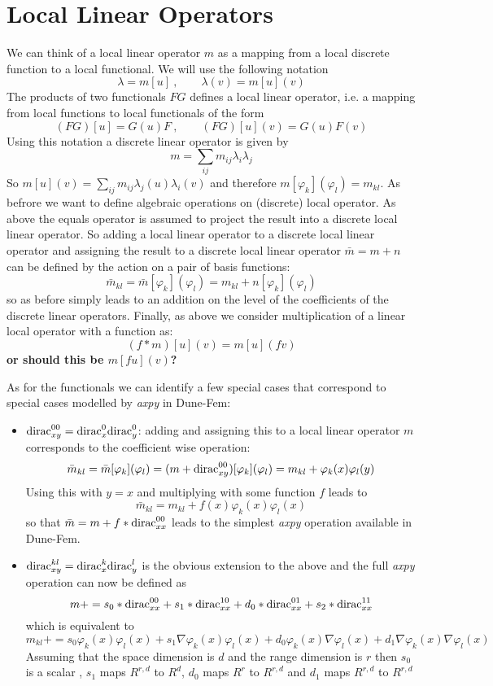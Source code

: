 \documentclass[12pt,a4paper]{article}
\newcommand{\dirac}{ {\rm dirac} }
\begin{document}
\section{Local Linear Operators}

We can think of a local linear operator $m$ as a mapping from a local
discrete function to a local functional. We will use the following notation
$$ \lambda=m[u]~,\qquad \lambda(v) = m[u](v) $$
The products of two functionals $FG$ defines a local linear operator, i.e. a mapping
from local functions to local functionals of the form 
$$ (FG)[u] = G(u)F~,\qquad (FG)[u](v) = G(u)F(v) $$
Using this notation a discrete linear operator is given by
$$ m = \sum_{ij} m_{ij} \lambda_i\lambda_j $$
So $m[u](v) = \sum_{ij} m_{ij} \lambda_j(u) \lambda_i(v)$ and 
therefore $m[\varphi_k](\varphi_l) = m_{kl}$.
As befrore we want to define algebraic operations on (discrete) local
operator. As above the equals operator is assumed to project the result
into a discrete local linear operator. So adding a local linear operator to
a discrete local linear operator and assigning the result to a discrete
local linear operator $\bar{m} = m + n$ can be defined by the action on a
pair of basis functions:
$$ \bar{m}_{kl} = \bar{m}[\varphi_k](\varphi_l) = m_{kl} + n[\varphi_k](\varphi_l) $$
so as before simply leads to an addition on the level of the coefficients
of the discrete linear operators. Finally, as above we consider
multiplication of a linear local operator with a function as:
$$ (f*m)[u](v) = m[u](fv) $$
{\bf or should this be $m[fu](v)$?}

As for the functionals we can identify a few special cases that correspond
to special cases modelled by \emph{axpy} in Dune-Fem:
\begin{itemize}
  \item $\dirac^{00}_{xy}=\dirac^0_x\dirac^0_y$: adding and assigning this to a local
    linear operator $m$ corresponds to the coefficient wise operation:
    $$ \bar{m}_{kl} = \bar{m}[\varphi_k](\varphi_l) = (m + \dirac^{00}_{xy})[\varphi_k](\varphi_l)
     = m_{kl} + \varphi_k(x)\varphi_l(y) $$
    Using this with $y=x$ and multiplying with some function $f$ leads to
    $$ \bar{m}_{kl} = m_{kl} + f(x)\varphi_k(x)\varphi_l(x) $$
    so that $\bar{m} = m + f*\dirac^{00}_{xx}$ leads to the simplest
    \emph{axpy} operation available in Dune-Fem.
  \item $\dirac^{kl}_{xy}=\dirac^k_x\dirac^l_y$ is the obvious extension to
    the above and the full \emph{axpy} operation can now be defined as
    $$ m += s_0*\dirac^{00}_{xx} + s_1*\dirac^{10}_{xx} + 
            d_0*\dirac^{01}_{xx} + s_2*\dirac^{11}_{xx} $$
    which is equivalent to
    $$ m_{kl} += s_0\varphi_k(x)\varphi_l(x) +
                 s_1\nabla\varphi_k(x)\varphi_l(x) +
                 d_0\varphi_k(x)\nabla\varphi_l(x) +
                 d_1\nabla\varphi_k(x)\nabla\varphi_l(x) $$
    Assuming that the space dimension is $d$ and the range dimension is $r$
    then $s_0$ is a scalar , $s_1$ maps $R^{r,d}$ to $R^d$, 
    $d_0$ maps $R^r$ to $R^{r,d}$ and $d_1$ maps $R^{r,d}$ to $R^{r,d}$
\end{itemize}
\end{document}
